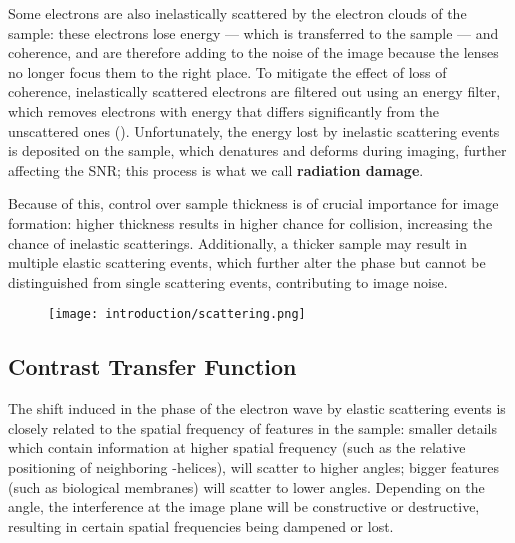 Some electrons are also inelastically scattered by the electron clouds of the sample: these electrons lose energy --- which is transferred to the sample --- and coherence, and are therefore adding to the noise of the image because the lenses no longer focus them to the right place.
To mitigate the effect of loss of coherence, inelastically scattered electrons are filtered out using an energy filter, which removes electrons with energy that differs significantly from the unscattered ones ().
Unfortunately, the energy lost by inelastic scattering events is deposited on the sample, which denatures and deforms during imaging, further affecting the SNR; this process is what we call \textbf{radiation damage}.

Because of this, control over sample thickness is of crucial importance for image formation: higher thickness results in higher chance for collision, increasing the chance of inelastic scatterings.
Additionally, a thicker sample may result in multiple elastic scattering events, which further alter the phase but cannot be distinguished from single scattering events, contributing to image noise.

\begin{figure}
    \centering
    \texttt{[image: introduction/scattering.png]}
    \label{fig:em_image_formation}
\end{figure}

\subsection{Contrast Transfer Function}\label{em_ctf}
The shift induced in the phase of the electron wave by elastic scattering events is closely related to the spatial frequency of features in the sample: smaller details which contain information at higher spatial frequency (such as the relative positioning of neighboring \alpha-helices), will scatter to higher angles; bigger features (such as biological membranes) will scatter to lower angles.
Depending on the angle, the interference at the image plane will be constructive or destructive, resulting in certain spatial frequencies being dampened or lost.

